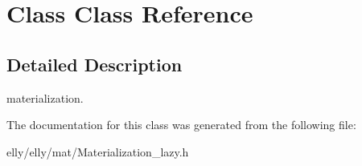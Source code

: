\hypertarget{class_class}{\section{Class Class Reference}
\label{class_class}
}


\subsection{Detailed Description}
materialization. 

The documentation for this class was generated from the following file\-:\begin{DoxyCompactItemize}
\item 
elly/elly/mat/Materialization\-\_\-lazy.\-h\end{DoxyCompactItemize}
